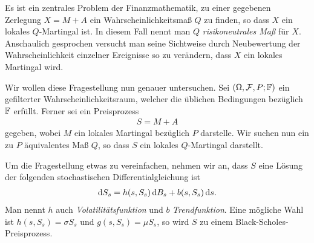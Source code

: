 \begin{ex}
Es ist ein zentrales Problem der Finanzmathematik, zu einer gegebenen Zerlegung
$X = M+A$ ein Wahrscheinlichkeitsmaß $Q$ zu finden, so dass $X$ ein
lokales $Q$-Martingal ist. In diesem Fall nennt man $Q$ \emph{risikoneutrales
Maß} für $X$. Anschaulich gesprochen versucht man seine Sichtweise durch
Neubewertung der Wahrscheinlichkeit einzelner Ereignisse so zu verändern, dass
$X$ ein lokales Martingal wird.

Wir wollen diese Fragestellung nun genauer untersuchen.
Sei $(\Omega,\mathcal{F},P;\mathbb{F})$ ein gefilterter Wahrscheinlichkeitsraum, welcher die
üblichen Bedingungen bezüglich $\mathbb{F}$ erfüllt. Ferner sei ein Preisprozess
\begin{align*}
S = M+A
\end{align*}
gegeben, wobei $M$ ein lokales Martingal bezüglich $P$ darstelle. Wir suchen nun
ein zu $P$ äquivalentes Maß $Q$, so dass $S$ ein lokales $Q$-Martingal
darstellt.

Um die Fragestellung etwas zu vereinfachen, nehmen wir an, dass $S$
eine Lösung der folgenden stochastischen Differentialgleichung ist
\begin{align*}
\mathrm{d} S_s = h(s,S_s)\,\mathrm{d} B_s + b(s,S_s)\,\mathrm{d} s. 
\end{align*} 
Man nennt $h$ auch \emph{Volatilitätsfunktion} und $b$ \emph{Trendfunktion}.
Eine mögliche Wahl ist $h(s,S_s) = \sigma S_s$ und $g(s,S_s) = \mu S_s$, so wird
$S$ zu einem Black-Scholes-Preisprozess.


\end{ex}
